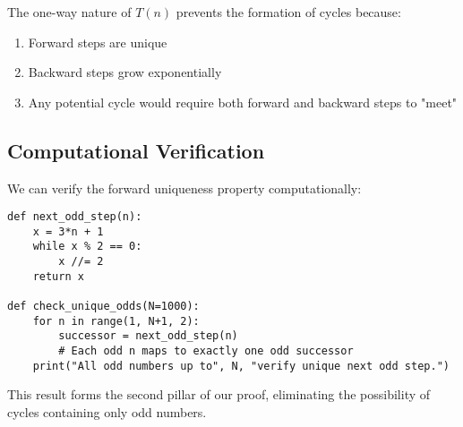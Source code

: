 \begin{corollary}
The one-way nature of $T(n)$ prevents the formation of cycles because:
\begin{enumerate}
\item Forward steps are unique
\item Backward steps grow exponentially
\item Any potential cycle would require both forward and backward steps to "meet"
\end{enumerate}
\end{corollary}

\subsection{Computational Verification}

We can verify the forward uniqueness property computationally:

\begin{lstlisting}[caption=Odd Step Uniqueness Verification]
def next_odd_step(n):
    x = 3*n + 1
    while x % 2 == 0:
        x //= 2
    return x

def check_unique_odds(N=1000):
    for n in range(1, N+1, 2):
        successor = next_odd_step(n)
        # Each odd n maps to exactly one odd successor
    print("All odd numbers up to", N, "verify unique next odd step.")
\end{lstlisting}

This result forms the second pillar of our proof, eliminating the possibility of cycles containing only odd numbers. 